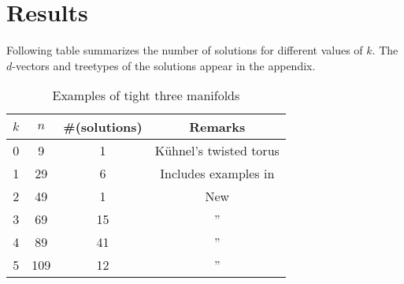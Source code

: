 \documentclass[11pt]{article}
\begin{document}
\section{Results}
Following table summarizes the number of solutions for different values of
$k$. The $d$-vectors and treetypes of the solutions appear in the appendix.

\begin{table}[htbp]\label{tab:results}
\centering
\begin{tabular}{|c|c|c|c|}
\hline
$k$ & $n$ & \#(solutions) & Remarks \\
\hline
0 & 9 & 1 & K\"{u}hnel's twisted torus \\
\hline
1 & 29 & 6 & Includes examples in \cite{bdns} \\
\hline
2 & 49 & 1 & New \\
\hline
3 & 69 & 15 & '' \\
\hline
4 & 89 & 41 & '' \\
\hline
5 & 109 & 12 & '' \\
\hline
\end{tabular}
\caption{Examples of tight three manifolds}
\end{table}
\end{document}
